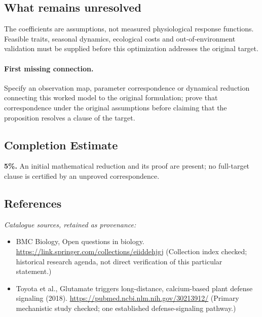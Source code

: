 \documentclass[11pt]{article}
\begin{document}
\subsection{What remains unresolved}
The coefficients are assumptions, not measured physiological response functions. Feasible traits, seasonal dynamics, ecological costs and out-of-environment validation must be supplied before this optimization addresses the original target.
\paragraph{First missing connection.} Specify an observation map, parameter correspondence or dynamical reduction connecting this worked model to the original formulation; prove that correspondence under the original assumptions before claiming that the proposition resolves a clause of the target.
\subsection{Completion Estimate}
\textbf{5\%.} An initial mathematical reduction and its proof are present; no full-target clause is certified by an unproved correspondence.
\subsection{References}
\noindent\emph{Catalogue sources, retained as provenance:}
\begin{itemize}
\item BMC Biology, Open questions in biology. \url{https://link.springer.com/collections/eiiddehjgj} (Collection index checked; historical research agenda, not direct verification of this particular statement.)
\item Toyota et al., Glutamate triggers long-distance, calcium-based plant defense signaling (2018). \url{https://pubmed.ncbi.nlm.nih.gov/30213912/} (Primary mechanistic study checked; one established defense-signaling pathway.)
\end{itemize}
\end{document}
